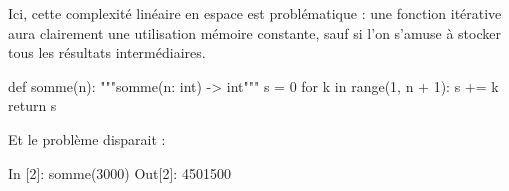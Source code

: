 \documentclass{magnolia}
\begin{document}
Ici, cette complexité linéaire en espace est problématique : une fonction itérative
aura clairement une utilisation mémoire constante, sauf si l'on s'amuse à stocker tous les
résultats intermédiaires.

\begin{pythoncodeline}
def somme(n):
    """somme(n: int) -> int"""
    s = 0
    for k in range(1, n + 1):
        s += k
    return s
\end{pythoncodeline}

\noindent Et le problème disparait :
\begin{pythoncode}
In [2]: somme(3000)
Out[2]: 4501500 
\end{pythoncode}




\end{document}
